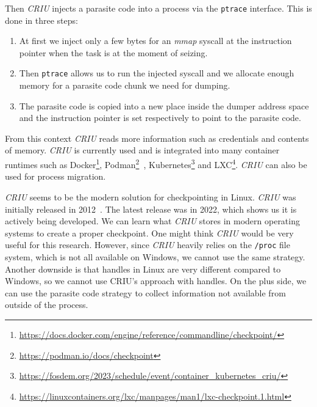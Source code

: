 \documentclass[a4paper, 11pt, english]{report}
\begin{document}
Then \textit{CRIU} injects a parasite code into a process via the \texttt{ptrace} interface. This is done in three steps:
\begin{enumerate}
	\item At first we inject only a few bytes for an \textit{mmap} syscall at the instruction pointer when the task is at the moment of seizing. 
	\item Then \texttt{ptrace} allows us to run the injected syscall and we allocate enough memory for a parasite code chunk we need for dumping. 
	\item The parasite code is copied into a new place inside the dumper address space and the instruction pointer is set respectively to point to the parasite code.
\end{enumerate}

From this context \textit{CRIU} reads more information such as credentials and contents of memory.
\textit{CRIU} is currently used and is integrated into many container runtimes such as Docker\footnote{\url{https://docs.docker.com/engine/reference/commandline/checkpoint/}}, Podman\footnote{\url{https://podman.io/docs/checkpoint}}~\cite{htet2021podman-criu}, Kubernetes\footnote{\url{https://fosdem.org/2023/schedule/event/container\_kubernetes\_criu/}} and LXC\footnote{\url{https://linuxcontainers.org/lxc/manpages/man1/lxc-checkpoint.1.html}}.
\textit{CRIU} can also be used for process migration.

\textit{CRIU} seems to be the modern solution for checkpointing in Linux. \textit{CRIU} was initially released in 2012~\cite{criu}.
The latest release was in 2022, which shows us it is actively being developed.
We can learn what \textit{CRIU} stores in modern operating systems to create a proper checkpoint.
One might think \textit{CRIU} would be very useful for this research.
However, since \textit{CRIU} heavily relies on the \texttt{/proc} file system, which is not all available on Windows, we cannot use the same strategy. Another downside is that handles in Linux are very different compared to Windows, so we cannot use CRIU's approach with handles.
On the plus side, we can use the parasite code strategy to collect information not available from outside of the process. 
\end{document}
